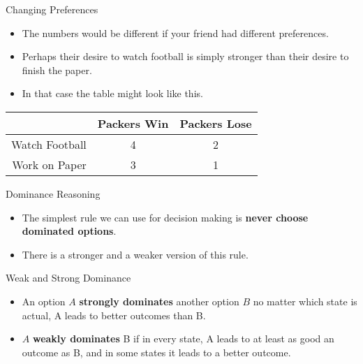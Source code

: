 \documentclass[
  ignorenonframetext,
]{beamer}
\providecommand{\tightlist}{%
  \setlength{\itemsep}{0pt}\setlength{\parskip}{0pt}}
\renewcommand{\,}{\text{, }}
\begin{document}
\begin{frame}{Changing Preferences}
\protect\hypertarget{changing-preferences}{}

\begin{itemize}
\tightlist
\item
  The numbers would be different if your friend had different
  preferences.
\item
  Perhaps their desire to watch football is simply stronger than their
  desire to finish the paper.
\item
  In that case the table might look like this.
\end{itemize}

\begin{longtable}[]{@{}rcc@{}}
\toprule
& Packers Win & Packers Lose\tabularnewline
\midrule
\endhead
Watch Football & 4 & 2\tabularnewline
Work on Paper & 3 & 1\tabularnewline
\bottomrule
\end{longtable}

\end{frame}

\begin{frame}{Dominance Reasoning}
\protect\hypertarget{dominance-reasoning}{}

\begin{itemize}
\tightlist
\item
  The simplest rule we can use for decision making is \textbf{never
  choose dominated options}.
\item
  There is a stronger and a weaker version of this rule.
\end{itemize}

\end{frame}

\begin{frame}{Weak and Strong Dominance}
\protect\hypertarget{weak-and-strong-dominance}{}

\begin{itemize}
\tightlist
\item
  An option \(A\) \textbf{strongly dominates} another option \(B\) no
  matter which state is actual, A leads to better outcomes than B.
  \pause 
\item
  \(A\) \textbf{weakly dominates} B if in every state, A leads to at
  least as good an outcome as B, and in some states it leads to a better
  outcome.
\end{itemize}

\end{frame}
\end{document}

